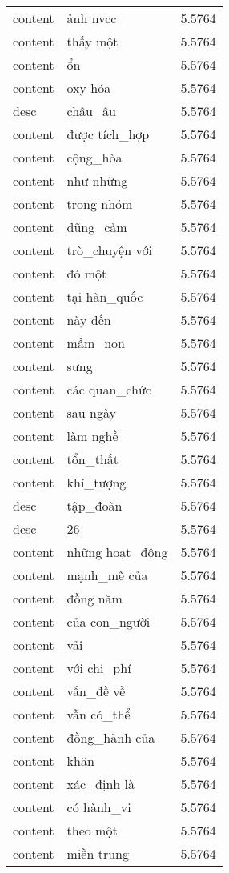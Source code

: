 \documentclass{article}
\begin{document}
\begin{tabular}{lll}
content & ảnh nvcc & 5.5764\\
content & thấy một & 5.5764\\
content & ổn & 5.5764\\
content & oxy hóa & 5.5764\\
desc & châu\_âu & 5.5764\\
content & được tích\_hợp & 5.5764\\
content & cộng\_hòa & 5.5764\\
content & như những & 5.5764\\
content & trong nhóm & 5.5764\\
content & dũng\_cảm & 5.5764\\
content & trò\_chuyện với & 5.5764\\
content & đó một & 5.5764\\
content & tại hàn\_quốc & 5.5764\\
content & này đến & 5.5764\\
content & mầm\_non & 5.5764\\
content & sưng & 5.5764\\
content & các quan\_chức & 5.5764\\
content & sau ngày & 5.5764\\
content & làm nghề & 5.5764\\
content & tổn\_thất & 5.5764\\
content & khí\_tượng & 5.5764\\
desc & tập\_đoàn & 5.5764\\
desc & 26 & 5.5764\\
content & những hoạt\_động & 5.5764\\
content & mạnh\_mẽ của & 5.5764\\
content & đồng năm & 5.5764\\
content & của con\_người & 5.5764\\
content & vải & 5.5764\\
content & với chi\_phí & 5.5764\\
content & vấn\_đề về & 5.5764\\
content & vẫn có\_thể & 5.5764\\
content & đồng\_hành của & 5.5764\\
content & khăn & 5.5764\\
content & xác\_định là & 5.5764\\
content & có hành\_vi & 5.5764\\
content & theo một & 5.5764\\
content & miền trung & 5.5764\\

\end{tabular}
\end{document}
